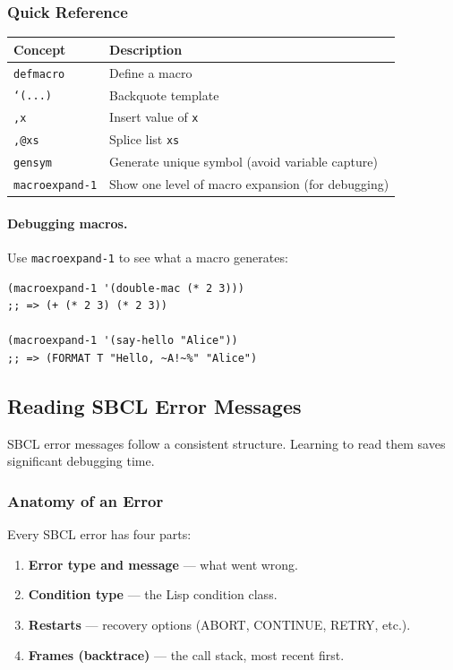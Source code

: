\subsubsection{Quick Reference}

\begin{center}
\begin{tabular}{lp{6cm}}
  \toprule
  \textbf{Concept} & \textbf{Description} \\
  \midrule
  \texttt{defmacro}  & Define a macro \\
  \texttt{`(...)}     & Backquote template \\
  \texttt{,x}         & Insert value of \texttt{x} \\
  \texttt{,@xs}       & Splice list \texttt{xs} \\
  \texttt{gensym}     & Generate unique symbol (avoid variable capture) \\
  \texttt{macroexpand-1} & Show one level of macro expansion (for debugging) \\
  \bottomrule
\end{tabular}
\end{center}

\paragraph{Debugging macros.}

Use \texttt{macroexpand-1} to see what a macro generates:

\begin{lstlisting}
(macroexpand-1 '(double-mac (* 2 3)))
;; => (+ (* 2 3) (* 2 3))

(macroexpand-1 '(say-hello "Alice"))
;; => (FORMAT T "Hello, ~A!~%" "Alice")
\end{lstlisting}

\subsection{Reading SBCL Error Messages}

SBCL error messages follow a consistent structure.
Learning to read them saves significant debugging time.

\subsubsection{Anatomy of an Error}

Every SBCL error has four parts:

\begin{enumerate}
  \item \textbf{Error type and message} --- what went wrong.
  \item \textbf{Condition type} --- the Lisp condition class.
  \item \textbf{Restarts} --- recovery options (ABORT, CONTINUE, RETRY, etc.).
  \item \textbf{Frames (backtrace)} --- the call stack, most recent first.
\end{enumerate}


